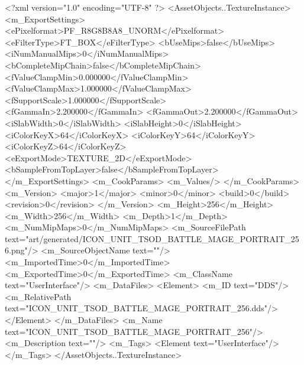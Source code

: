 <?xml version="1.0" encoding="UTF-8" ?>
<AssetObjects..TextureInstance>
	<m_ExportSettings>
		<ePixelformat>PF_R8G8B8A8_UNORM</ePixelformat>
		<eFilterType>FT_BOX</eFilterType>
		<bUseMips>false</bUseMips>
		<iNumManualMips>0</iNumManualMips>
		<bCompleteMipChain>false</bCompleteMipChain>
		<fValueClampMin>0.000000</fValueClampMin>
		<fValueClampMax>1.000000</fValueClampMax>
		<fSupportScale>1.000000</fSupportScale>
		<fGammaIn>2.200000</fGammaIn>
		<fGammaOut>2.200000</fGammaOut>
		<iSlabWidth>0</iSlabWidth>
		<iSlabHeight>0</iSlabHeight>
		<iColorKeyX>64</iColorKeyX>
		<iColorKeyY>64</iColorKeyY>
		<iColorKeyZ>64</iColorKeyZ>
		<eExportMode>TEXTURE_2D</eExportMode>
		<bSampleFromTopLayer>false</bSampleFromTopLayer>
	</m_ExportSettings>
	<m_CookParams>
		<m_Values/>
	</m_CookParams>
	<m_Version>
		<major>1</major>
		<minor>0</minor>
		<build>0</build>
		<revision>0</revision>
	</m_Version>
	<m_Height>256</m_Height>
	<m_Width>256</m_Width>
	<m_Depth>1</m_Depth>
	<m_NumMipMaps>0</m_NumMipMaps>
	<m_SourceFilePath text="art/generated/ICON_UNIT_TSOD_BATTLE_MAGE_PORTRAIT_256.png"/>
	<m_SourceObjectName text=""/>
	<m_ImportedTime>0</m_ImportedTime>
	<m_ExportedTime>0</m_ExportedTime>
	<m_ClassName text="UserInterface"/>
	<m_DataFiles>
		<Element>
			<m_ID text="DDS"/>
			<m_RelativePath text="ICON_UNIT_TSOD_BATTLE_MAGE_PORTRAIT_256.dds"/>
		</Element>
	</m_DataFiles>
	<m_Name text="ICON_UNIT_TSOD_BATTLE_MAGE_PORTRAIT_256"/>
	<m_Description text=""/>
	<m_Tags>
		<Element text="UserInterface"/>
	</m_Tags>
</AssetObjects..TextureInstance>
